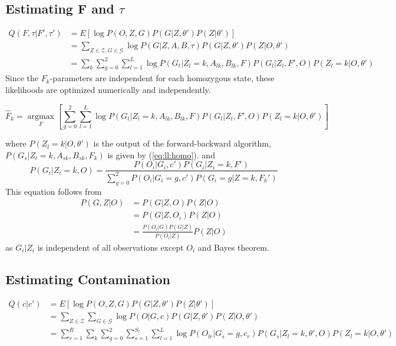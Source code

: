 \documentclass[10pt,a4paper]{article}
\begin{document}
\subsection{Estimating F and $\tau$}
\begin{align}
Q(F, \tau|F', \tau' )&= E[\log P(O, Z, G )  P(G|Z, \theta') P(Z | \theta')]\nonumber\\
&=\sum_{Z \in \mathcal{Z}, G \in \mathcal{G}} \log P(G  | Z, A, B, \tau) P(G|Z, \theta') P(Z | O, \theta')\nonumber\\
&=\sum_k\sum_{g=0}^2\sum_{l=1}^L \log P(G_t | Z_l=k, A_{lk}, B_{lk}, F)  P(G_l|Z_l, F', O) P(Z_l=k | O, \theta')
\end{align}
Since the $F_k$-parameters are independent for each homozygous state, these likelihoods are optimized numerically and independently.

\begin{equation}
\hat{F}_k =\operatorname*{argmax}_F \left[ \sum_{g=0}^2\sum_{l=1}^L \log P(G_t | Z_l=k, A_{lk}, B_{lk}, F)  P(G_l|Z_l, F', O) P(Z_l=k | O, \theta') 
\right]\label{eq:opt:F}
\end{equation}

where $P(Z_l = k |O, \theta')$ is the output of the forward-backward algorithm, $P(G_s | Z_l=k, A_{sk}, B_{sk}, F_k)$ is given by (\ref{eq:ll:homo}).   and
\begin{equation}
P(G_i | Z_i=k, O) = \frac{P(O_i | G_i, c') P(G_i | Z_i=k, F')}{ \sum_{g=0}^2 P(O_i | G_i=g, c') P(G_i=g | Z=k, F_k') }
\label{eq:em:G}
\end{equation}
This equation follows from 
\begin{align}
P(G,Z| O) &= P(G|Z, O)P(Z|O)\nonumber\\
&=P(G | Z, O_i) P(Z | O)\nonumber\\
&= \frac{P(O_i | G) P(G|Z)}{P(O_i | Z)} P(Z|O)
\end{align}
as $G_i | Z_i$ is independent of all observations except $O_i$ and Bayes theorem.




\subsection{Estimating Contamination}
\begin{align}
Q(c|c' )&= E[\log P(O, Z, G )  P(G|Z, \theta') P(Z | \theta')]\nonumber\\
&=\sum_{Z \in \mathcal{Z}}\sum_{G \in \mathcal{G}} \log P( O | G, c) P(G|Z, \theta') P(Z | O, \theta')\nonumber\\
&=\sum_{r=1}^R\sum_k\sum_{g=0}^2 \sum_{s=1}^{S_l}\sum_{l=1}^L \log P(O_{lr} | G_s=g, c_r)  P(G_s|Z_l=k, \theta', O) P(Z_l=k | O, \theta')
\end{align}
\end{document}
